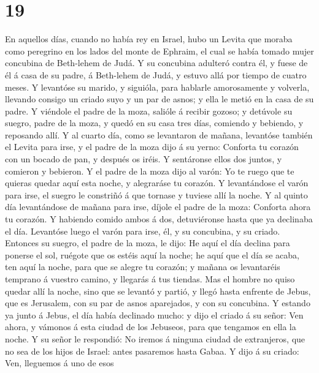\hypertarget{section-18}{%
\section{19}\label{section-18}}

 En aquellos días, cuando no había rey en Israel, hubo un
Levita que moraba como peregrino en los lados del monte de Ephraim, el
cual se había tomado mujer concubina de Beth-lehem de Judá.
 Y su concubina adulteró contra él, y fuese de él á casa
de su padre, á Beth-lehem de Judá, y estuvo allá por tiempo de cuatro
meses.  Y levantóse su marido, y siguióla, para hablarle
amorosamente y volverla, llevando consigo un criado suyo y un par de
asnos; y ella le metió en la casa de su padre.  Y viéndole
el padre de la moza, salióle á recibir gozoso; y detúvole su suegro,
padre de la moza, y quedó en su casa tres días, comiendo y bebiendo, y
reposando allí.  Y al cuarto día, como se levantaron de
mañana, levantóse también el Levita para irse, y el padre de la moza
dijo á su yerno: Conforta tu corazón con un bocado de pan, y después os
iréis.  Y sentáronse ellos dos juntos, y comieron y
bebieron. Y el padre de la moza dijo al varón: Yo te ruego que te
quieras quedar aquí esta noche, y alegraráse tu corazón. 
Y levantándose el varón para irse, el suegro le constriñó á que tornase
y tuviese allí la noche.  Y al quinto día levantándose de
mañana para irse, díjole el padre de la moza: Conforta ahora tu corazón.
Y habiendo comido ambos á dos, detuviéronse hasta que ya declinaba el
día.  Levantóse luego el varón para irse, él, y su
concubina, y su criado. Entonces su suegro, el padre de la moza, le
dijo: He aquí el día declina para ponerse el sol, ruégote que os estéis
aquí la noche; he aquí que el día se acaba, ten aquí la noche, para que
se alegre tu corazón; y mañana os levantaréis temprano á vuestro camino,
y llegarás á tus tiendas.  Mas el hombre no quiso quedar
allí la noche, sino que se levantó y partió, y llegó hasta enfrente de
Jebus, que es Jerusalem, con su par de asnos aparejados, y con su
concubina.  Y estando ya junto á Jebus, el día había
declinado mucho: y dijo el criado á su señor: Ven ahora, y vámonos á
esta ciudad de los Jebuseos, para que tengamos en ella la noche.
 Y su señor le respondió: No iremos á ninguna ciudad de
extranjeros, que no sea de los hijos de Israel: antes pasaremos hasta
Gabaa. Y dijo á su criado:  Ven, lleguemos á uno de esos
